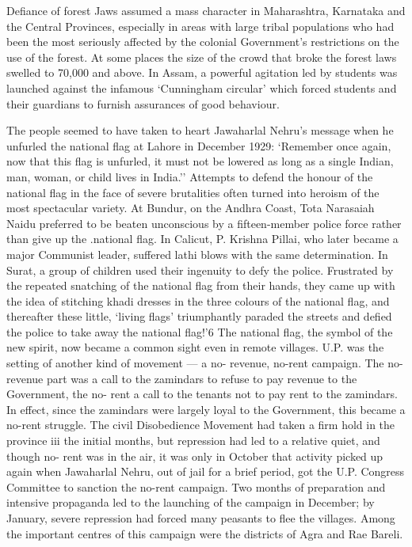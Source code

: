 \begin{multicols}{2}
Defiance of forest Jaws assumed a mass character in Maharashtra, Karnataka and the Central Provinces, especially in areas with large tribal populations who had been the most seriously affected by the colonial Government's restrictions on the use of the forest. At some places the size of the crowd that broke the forest laws swelled to 70,000 and above. In Assam, a powerful agitation led by students was launched against the infamous `Cunningham circular' which forced students and their guardians to furnish assurances of good behaviour.

The people seemed to have taken to heart Jawaharlal Nehru's message when he unfurled the national flag at Lahore in December 1929: `Remember once again, now that this flag is unfurled, it must not be lowered as long as a single Indian, man, woman, or child lives in India.'' Attempts to defend the honour of the national flag in the face of severe brutalities often turned into heroism of the most spectacular variety. At Bundur, on the Andhra Coast, Tota Narasaiah Naidu preferred to be beaten unconscious by a fifteen-member police force rather than give up the .national flag. In Calicut, P. Krishna Pillai, who later became a major Communist leader, suffered lathi blows with the same determination. In Surat, a group of children used their ingenuity to defy the police. Frustrated by the repeated snatching of the national flag from their hands, they came up with the idea of stitching khadi dresses in the three colours of the national flag, and thereafter these little, `living flags' triumphantly paraded the streets and defied the police to take away the national flag!'6 The national flag, the symbol of the new spirit, now became a common sight even in remote villages. U.P. was the setting of another kind of movement --- a no- revenue, no-rent campaign. The no-revenue part was a call to the zamindars to refuse to pay revenue to the Government, the no- rent a call to the tenants not to pay rent to the zamindars. In effect, since the zamindars were largely loyal to the Government, this became a no-rent struggle. The civil Disobedience Movement had taken a firm hold in the province iii the initial months, but repression had led to a relative quiet, and though no- rent was in the air, it was only in October that activity picked up again when Jawaharlal Nehru, out of jail for a brief period, got the U.P. Congress Committee to sanction the no-rent campaign. Two months of preparation and intensive propaganda led to the launching of the campaign in December; by January, severe repression had forced many peasants to flee the villages. Among the important centres of this campaign were the districts of Agra and Rae Bareli.


\end{multicols}
